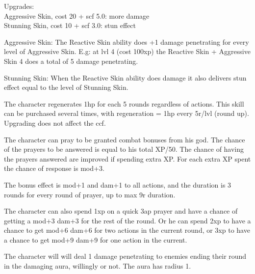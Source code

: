 Upgrades: \\
Aggressive Skin, cost 20 + scf 5.0: more damage\\
Stunning Skin, cost 10 + scf 3.0: stun effect

Aggressive Skin: The Reactive Skin ability does +1 damage penetrating for every level of Aggressive Skin. E.g: at lvl 4 (cost 100xp) the Reactive Skin + Aggressive Skin 4 does a total of 5 damage penetrating.

Stunning Skin: When the Reactive Skin ability does damage it also delivers stun effect equal to the level of Stunning Skin.


 The character regenerates 1hp for each 5 rounds regardless of actions. This skill can be purchased several times, with regeneration = 1hp every 5r/lvl (round up). Upgrading does not affect the ccf.


 The character can pray to be granted combat bonuses from his god. The chance of the prayers to be answered is equal to his total XP/50. The chance of having the prayers answered are improved if spending extra XP. For each extra XP spent the chance of response is mod+3.

The bonus effect is mod+1 and dam+1 to all actions, and the duration is 3 rounds for every round of prayer, up to max 9r duration.

The character can also spend 1xp on a quick 3ap prayer and have a chance of getting a mod+3 dam+3 for the rest of the round. Or he can spend 2xp to have a chance to get mod+6 dam+6 for two actions in the current round, or 3xp to have a chance to get mod+9 dam+9 for one action in the current. %


 The character will will deal 1 damage penetrating to enemies ending their round in the damaging aura, willingly or not. The aura has radius 1.

